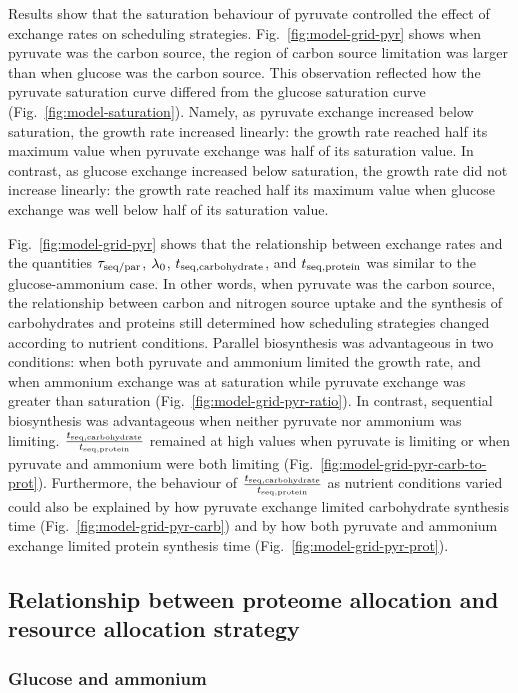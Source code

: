 Results show that the saturation behaviour of pyruvate controlled the effect of exchange rates on scheduling strategies.
Fig.\ \ref{fig:model-grid-pyr} shows when pyruvate was the carbon source, the region of carbon source limitation was larger than when glucose was the carbon source.
This observation reflected how the pyruvate saturation curve differed from the glucose saturation curve (Fig.\ \ref{fig:model-saturation}).
Namely, as pyruvate exchange increased below saturation, the growth rate increased linearly: the growth rate reached half its maximum value when pyruvate exchange was half of its saturation value.
In contrast, as glucose exchange increased below saturation, the growth rate did not increase linearly: the growth rate reached half its maximum value when glucose exchange was well below half of its saturation value.

Fig.\ \ref{fig:model-grid-pyr} shows that the relationship between exchange rates and the quantities $\tau_{\mathrm{seq}/\mathrm{par}}$, $\lambda_{0}$, $t_{\mathrm{seq},\mathrm{carbohydrate}}$, and $t_{\mathrm{seq},\mathrm{protein}}$ was similar to the glucose-ammonium case.
In other words, when pyruvate was the carbon source, the relationship between carbon and nitrogen source uptake and the synthesis of carbohydrates and proteins still determined how scheduling strategies changed according to nutrient conditions.
Parallel biosynthesis was advantageous in two conditions: when both pyruvate and ammonium limited the growth rate, and when ammonium exchange was at saturation while pyruvate exchange was greater than saturation (Fig.\ \ref{fig:model-grid-pyr-ratio}).
In contrast, sequential biosynthesis was advantageous when neither pyruvate nor ammonium was limiting.
$\frac{t_{\mathrm{seq},\mathrm{carbohydrate}}}{t_{\mathrm{seq},\mathrm{protein}}}$ remained at high values when pyruvate is limiting or when pyruvate and ammonium were both limiting (Fig.\ \ref{fig:model-grid-pyr-carb-to-prot}).
Furthermore, the behaviour of $\frac{t_{\mathrm{seq},\mathrm{carbohydrate}}}{t_{\mathrm{seq},\mathrm{protein}}}$ as nutrient conditions varied could also be explained by how pyruvate exchange limited carbohydrate synthesis time (Fig.\ \ref{fig:model-grid-pyr-carb}) and by how both pyruvate and ammonium exchange limited protein synthesis time (Fig.\ \ref{fig:model-grid-pyr-prot}).


\subsection{Relationship between proteome allocation and resource allocation strategy}
\label{subsec:model-rank}

\subsubsection{Glucose and ammonium}
\label{subsec:model-rank-glucose}

